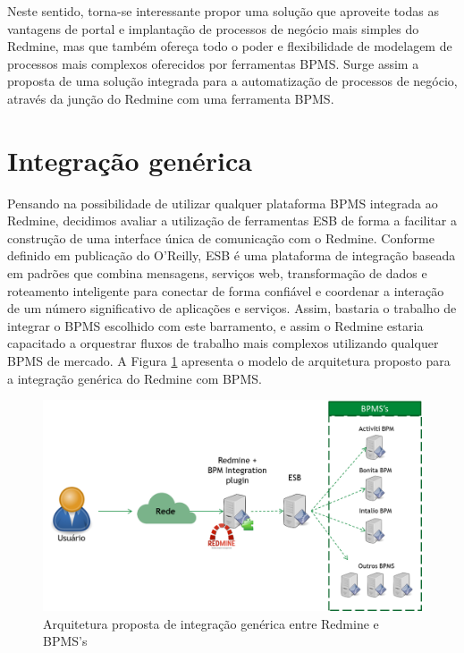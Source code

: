 Neste sentido, torna-se interessante propor uma solução que aproveite todas as vantagens de portal e implantação de processos de negócio mais simples do Redmine, mas que também ofereça todo o poder e flexibilidade de modelagem de processos mais complexos oferecidos por ferramentas BPMS. Surge assim a proposta de uma solução integrada para a automatização de processos de negócio, através da junção do Redmine com uma ferramenta BPMS.

\section{Integração genérica}\label{sec:cenario-integracao-genérica}

 Pensando na possibilidade de utilizar qualquer plataforma BPMS integrada ao Redmine, decidimos avaliar a utilização de ferramentas ESB\cite{esb} de forma a facilitar a construção de uma interface única de comunicação com o Redmine. Conforme definido em publicação do O'Reilly\cite{oreilly_esb}, ESB é uma plataforma de integração baseada em padrões que combina mensagens, serviços web, transformação de dados e roteamento inteligente para conectar de forma confiável e coordenar a interação de um número significativo de aplicações e serviços. Assim, bastaria o trabalho de integrar o BPMS escolhido com este barramento, e assim o Redmine estaria capacitado a orquestrar fluxos de trabalho mais complexos utilizando qualquer BPMS de mercado. A Figura \ref{fig:arquitetura_integracao_generica_redmine_bpm}  apresenta o modelo de arquitetura proposto para a integração genérica do Redmine com BPMS.

\begin{figure}[H]
\centering
\includegraphics[width=1\textwidth]{imagens/arquitetura_proposta_inicialmente_bpm_integration.png}
\caption{Arquitetura proposta de integração genérica entre Redmine e BPMS's}
\label{fig:arquitetura_integracao_generica_redmine_bpm}
\end{figure}


